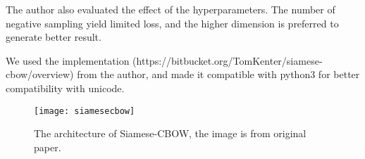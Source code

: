 The author also evaluated the effect of the hyperparameters. The number of negative sampling yield limited loss, and the higher dimension is preferred to generate better result.

We used the implementation (https://bitbucket.org/TomKenter/siamese-cbow/overview) from the author, and made it compatible with python3 for better compatibility with unicode.

\begin{figure}[h]
    \centering
	\texttt{[image: siamesecbow]}
    \caption{The architecture of Siamese-CBOW, the image is from original paper\cite{kenter2016siamesecbow}.}
    \label{fig:siamese}
\end{figure}

